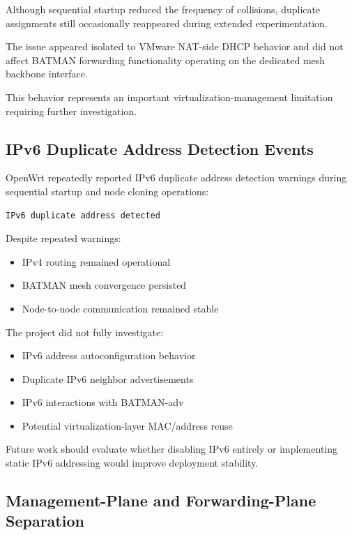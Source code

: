 \documentclass[conference]{IEEEtran}
\begin{document}
Although sequential startup reduced the frequency of collisions, duplicate assignments still occasionally reappeared during extended experimentation.

The issue appeared isolated to VMware NAT-side DHCP behavior and did not affect BATMAN forwarding functionality operating on the dedicated mesh backbone interface.

This behavior represents an important virtualization-management limitation requiring further investigation.

\subsection{IPv6 Duplicate Address Detection Events}

OpenWrt repeatedly reported IPv6 duplicate address detection warnings during sequential startup and node cloning operations:

\begin{lstlisting}
IPv6 duplicate address detected
\end{lstlisting}

Despite repeated warnings:

\begin{itemize}
    \item IPv4 routing remained operational
    \item BATMAN mesh convergence persisted
    \item Node-to-node communication remained stable
\end{itemize}

The project did not fully investigate:

\begin{itemize}
    \item IPv6 address autoconfiguration behavior
    \item Duplicate IPv6 neighbor advertisements
    \item IPv6 interactions with BATMAN-adv
    \item Potential virtualization-layer MAC/address reuse
\end{itemize}

Future work should evaluate whether disabling IPv6 entirely or implementing static IPv6 addressing would improve deployment stability.

\subsection{Management-Plane and Forwarding-Plane Separation}
\end{document}
